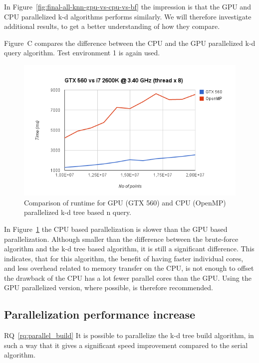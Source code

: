 In Figure~\ref{fig:final-all-knn-gpu-vs-cpu-vs-bf} the impression is that the GPU and CPU parallelized k-d algorithms performs similarly. We will therefore investigate additional results, to get a better understanding of how they compare.

Figure~C compares the difference between the CPU and the GPU parallelized k-d query algorithm. Test environment 1 is again used.

\begin{figure}[ht!]
    \centering
    \includegraphics[width=120mm]{../gfx/v17-gpu-vs-cpu.png}
    \caption{Comparison of runtime for GPU (GTX 560) and CPU (OpenMP) parallelized k-d tree based n query.}
    \label{fig:v17-gpu-vs-cpu}
\end{figure}

In Figure~\ref{fig:v17-gpu-vs-cpu} the CPU based parallelization is slower than the GPU based parallelization. Although smaller than the difference between the brute-force algorithm and the k-d tree based algorithm, it is still a significant difference. This indicates, that for this algorithm, the benefit of having faster individual cores, and less overhead related to memory transfer on the CPU, is not enough to offset the drawback of the CPU has a lot fewer parallel cores than the GPU. Using the GPU parallelized version, where possible, is therefore recommended.

\subsection{Parallelization performance increase} %
\label{sub:parallelization_performance_increase}

RQ~\ref{rq:parallel_build} It is possible to parallelize the k-d tree build algorithm, in such a way that it gives a significant speed improvement compared to the serial algorithm.

